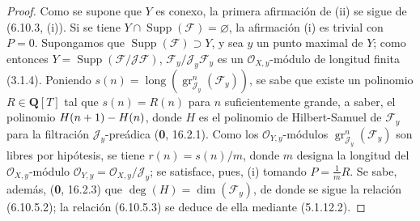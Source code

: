 \begin{proof}
Como se supone que $Y$ es conexo, la primera afirmación de (ii) se sigue de
(6.10.3, (i)). Si se tiene
$Y\cap\operatorname{Supp}(\mathcal F)=\varnothing$, la afirmación (i) es
trivial con $P=0$. Supongamos que
$\operatorname{Supp}(\mathcal F)\supset Y$, y sea $y$ un punto maximal de
$Y$; como entonces $Y=\operatorname{Supp}(\mathcal F/\mathcal J\mathcal F)$,
$\mathcal F_y/\mathcal J_y\mathcal F_y$ es un
$\mathcal O_{X,y}$-módulo de longitud finita (3.1.4). Poniendo
$s(n)=\operatorname{long}(\operatorname{gr}_{\mathcal J_y}^{n}(\mathcal F_y))$,
se sabe que existe un polinomio $R\in\mathbf Q[T]$ tal que $s(n)=R(n)$ para
$n$ suficientemente grande, a saber, el polinomio $H(n+1)- H(n)$, donde $H$ es el polinomio
de Hilbert-Samuel de $\mathcal F_y$ para la filtración
$\mathcal J_y$-preádica (\textbf 0, 16.2.1). Como los
$\mathcal O_{Y,y}$-módulos
$\operatorname{gr}_{\mathcal J_y}^{n}(\mathcal F_y)$ son libres por
hipótesis, se tiene $r(n)=s(n)/m$, donde $m$ designa la longitud del
$\mathcal O_{X,y}$-módulo $\mathcal O_{Y,y}=\mathcal O_{X,y}/\mathcal J_y$; se satisface,
pues, (i)
tomando $P=\frac{1}{m}R$. Se sabe, además, (\textbf 0, 16.2.3) que
$\deg(H)=\dim(\mathcal F_y)$, de donde se sigue la relación (6.10.5.2); la relación
(6.10.5.3) se deduce de ella mediante (5.1.12.2).


\end{proof}
